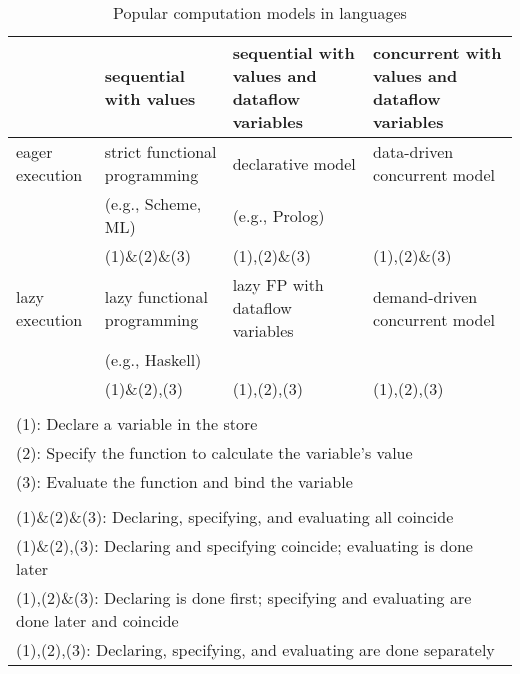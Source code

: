 \begin{table} [h]
  \begin{center} 
  \begin{tabular}  {|m{2.5cm} |m{3 cm} |m{3 cm} | m{3 cm} |}
    \hline
    &sequential with values&sequential with values and dataflow variables&concurrent with values and dataflow variables\\
    \hline
   eager execution&strict functional programming&declarative model&data-driven concurrent model\\
  &(e.g., Scheme, ML)&(e.g., Prolog)&\\
  & (1)\&(2)\&(3)&(1),(2)\&(3)&(1),(2)\&(3)\\
    \hline
  lazy execution & lazy functional programming & lazy FP with dataflow variables & demand-driven concurrent model\\
  & (e.g., Haskell) &&\\
  & (1)\&(2),(3) & (1),(2),(3)&(1),(2),(3)\\ 
  \hline
  \multicolumn{4}{l}{}\\
  \multicolumn{4}{l}{(1): Declare a variable in the store}\\
  \multicolumn{4}{l}{(2): Specify the function to calculate the variable's value}\\
  \multicolumn{4}{l}{(3): Evaluate the function and bind the variable}\\
  \multicolumn{4}{l}{}\\
  \multicolumn{4}{l}{(1)\&(2)\&(3): Declaring, specifying, and evaluating all coincide}\\
  \multicolumn{4}{l}{(1)\&(2),(3): Declaring and specifying coincide; evaluating is done later}\\
  \multicolumn{4}{l}{(1),(2)\&(3): Declaring is done first; specifying and evaluating are done later and coincide}\\
  \multicolumn{4}{l}{(1),(2),(3): Declaring, specifying, and evaluating are done separately}\\
  \end{tabular}
  \end{center}
  \caption{Popular computation models in languages}
  \label{var_life}
\end{table}

